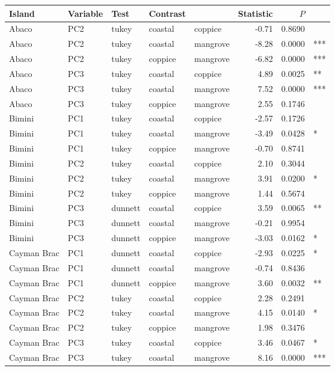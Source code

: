 
\begin{tabular}{lllllrrl}
\toprule
Island & Variable & Test & Contrast &  & Statistic & $P$ & \\
\midrule
Abaco & PC2 & tukey & coastal & coppice & -0.71 & 0.8690 & \\
Abaco & PC2 & tukey & coastal & mangrove & -8.28 & 0.0000 & ***\\
Abaco & PC2 & tukey & coppice & mangrove & -6.82 & 0.0000 & ***\\
Abaco & PC3 & tukey & coastal & coppice & 4.89 & 0.0025 & **\\
Abaco & PC3 & tukey & coastal & mangrove & 7.52 & 0.0000 & ***\\
Abaco & PC3 & tukey & coppice & mangrove & 2.55 & 0.1746 & \\
Bimini & PC1 & tukey & coastal & coppice & -2.57 & 0.1726 & \\
Bimini & PC1 & tukey & coastal & mangrove & -3.49 & 0.0428 & *\\
Bimini & PC1 & tukey & coppice & mangrove & -0.70 & 0.8741 & \\
Bimini & PC2 & tukey & coastal & coppice & 2.10 & 0.3044 & \\
Bimini & PC2 & tukey & coastal & mangrove & 3.91 & 0.0200 & *\\
Bimini & PC2 & tukey & coppice & mangrove & 1.44 & 0.5674 & \\
Bimini & PC3 & dunnett & coastal & coppice & 3.59 & 0.0065 & **\\
Bimini & PC3 & dunnett & coastal & mangrove & -0.21 & 0.9954 & \\
Bimini & PC3 & dunnett & coppice & mangrove & -3.03 & 0.0162 & *\\
Cayman Brac & PC1 & dunnett & coastal & coppice & -2.93 & 0.0225 & *\\
Cayman Brac & PC1 & dunnett & coastal & mangrove & -0.74 & 0.8436 & \\
Cayman Brac & PC1 & dunnett & coppice & mangrove & 3.60 & 0.0032 & **\\
Cayman Brac & PC2 & tukey & coastal & coppice & 2.28 & 0.2491 & \\
Cayman Brac & PC2 & tukey & coastal & mangrove & 4.15 & 0.0140 & *\\
Cayman Brac & PC2 & tukey & coppice & mangrove & 1.98 & 0.3476 & \\
Cayman Brac & PC3 & tukey & coastal & coppice & 3.46 & 0.0467 & *\\
Cayman Brac & PC3 & tukey & coastal & mangrove & 8.16 & 0.0000 & ***\\

\end{tabular}

